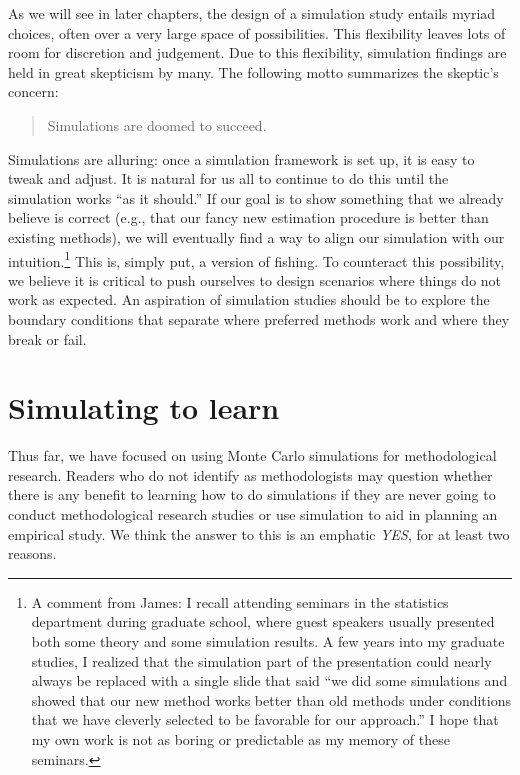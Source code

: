 \documentclass[
]{book}
\begin{document}
As we will see in later chapters, the design of a simulation study entails myriad choices, often over a very large space of possibilities.
This flexibility leaves lots of room for discretion and judgement.
Due to this flexibility, simulation findings are held in great skepticism by many.
The following motto summarizes the skeptic's concern:

\begin{quote}
Simulations are doomed to succeed.
\end{quote}

Simulations are alluring: once a simulation framework is set up, it is easy to tweak and adjust.
It is natural for us all to continue to do this until the simulation works ``as it should.''
If our goal is to show something that we already believe is correct (e.g., that our fancy new estimation procedure is better than existing methods), we will eventually find a way to align our simulation with our intuition.\footnote{A comment from James: I recall attending seminars in the statistics department during graduate school, where guest speakers usually presented both some theory and some simulation results. A few years into my graduate studies, I realized that the simulation part of the presentation could nearly always be replaced with a single slide that said ``we did some simulations and showed that our new method works better than old methods under conditions that we have cleverly selected to be favorable for our approach.'' I hope that my own work is not as boring or predictable as my memory of these seminars.}
This is, simply put, a version of fishing.
To counteract this possibility, we believe it is critical to push ourselves to design scenarios where things do not work as expected.
An aspiration of simulation studies should be to explore the boundary conditions that separate where preferred methods work and where they break or fail.

\section{Simulating to learn}\label{simulating-to-learn}

Thus far, we have focused on using Monte Carlo simulations for methodological research.
Readers who do not identify as methodologists may question whether there is any benefit to learning how to do simulations if they are never going to conduct methodological research studies or use simulation to aid in planning an empirical study.
We think the answer to this is an emphatic \emph{YES}, for at least two reasons.
\end{document}
